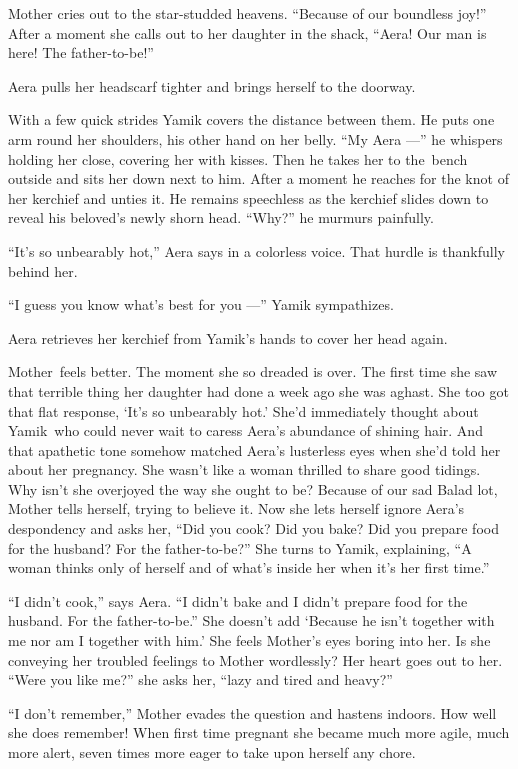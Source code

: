 \documentclass[twoside,11pt]{book}
\begin{document}
Mother cries out to the star-studded heavens. ``Because of our boundless joy!'' After a
moment she calls out to her daughter in the shack, ``Aera! Our man is here! The
father-to-be!''

Aera pulls her headscarf tighter and brings herself to the doorway.

With a few quick strides Yamik covers the distance between them. He puts one arm round her shoulders, his other hand on
her belly. ``My Aera ---'' he whispers holding her close, covering her with kisses. Then he
takes her to the~bench outside and sits her down next to him. After a moment he reaches for the knot of her kerchief
and unties it. He remains speechless as the kerchief slides down to reveal his beloved's newly shorn head.
``Why?'' he murmurs painfully.

``It's so unbearably hot,'' Aera says in a colorless voice. That hurdle is thankfully behind
her.

``I guess you know what's best for you ---'' Yamik sympathizes.

Aera retrieves her kerchief from Yamik's hands to cover her head again.

Mother~feels better. The moment she so dreaded is over. The first time she saw that terrible thing her daughter had done
a week ago she was aghast. She too got that flat response, `It's so unbearably hot.' She'd immediately thought about
Yamik~who could never wait to caress Aera's abundance of shining hair. And that apathetic tone somehow matched Aera's
lusterless eyes when she'd told her about her pregnancy. She wasn't like a woman thrilled to share good tidings. Why
isn't she overjoyed the way she ought to be? Because of our sad Balad lot, Mother tells herself, trying to believe it.
 Now she lets herself ignore Aera's despondency and asks her, ``Did you cook? Did you bake? Did you
prepare food for the husband? For the father-to-be?'' She turns to Yamik, explaining, ``A
woman thinks only of herself and of what's inside her when it's her first time.''

``I didn't cook,'' says Aera. ``I didn't bake and I didn't prepare food for the
husband. For the father-to-be.'' She doesn't add `Because he isn't together with me nor am I together with
him.' She feels Mother's eyes boring into her. Is she conveying her troubled feelings to Mother wordlessly? Her
heart goes out to her. ``Were you like me?'' she asks her, ``lazy and tired and heavy?''

``I don't remember,'' Mother evades the question and hastens indoors. How well she does
remember! When first time pregnant she became much more agile, much more alert, seven times more eager to take upon
herself any chore.
\end{document}
